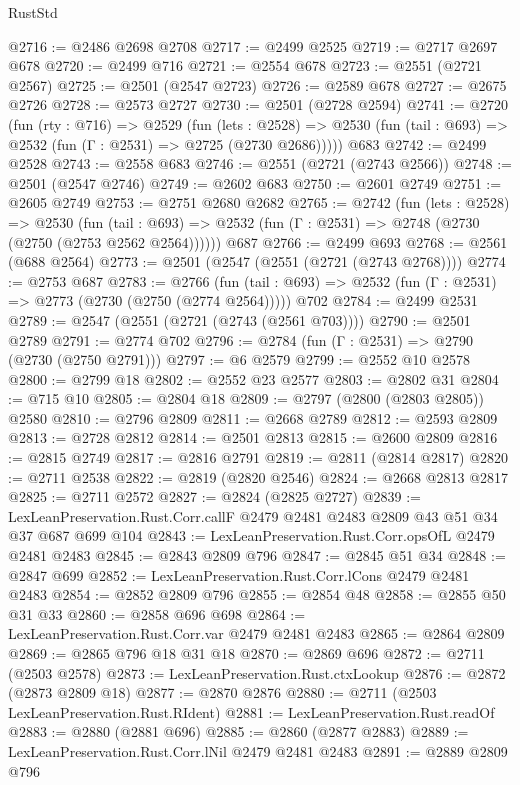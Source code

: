 \begin{lexlean}{RustStd}
\begin{coremodule}
{\begin{coremodule}
{{{{{{{{{{{{{{{{{{{{@2716 := @2486 @2698 @2708
@2717 := @2499 @2525
@2719 := @2717 @2697 @678
@2720 := @2499 @716
@2721 := @2554 @678
@2723 := @2551 (@2721 @2567)
@2725 := @2501 (@2547 @2723)
@2726 := @2589 @678
@2727 := @2675 @2726
@2728 := @2573 @2727
@2730 := @2501 (@2728 @2594)
@2741 := @2720
    (fun (rty : @716) =>
    @2529
      (fun (lets : @2528) =>
      @2530 (fun (tail : @693) => @2532 (fun (Γ : @2531) => @2725 (@2730 @2686)))))
    @683
@2742 := @2499 @2528
@2743 := @2558 @683
@2746 := @2551 (@2721 (@2743 @2566))
@2748 := @2501 (@2547 @2746)
@2749 := @2602 @683
@2750 := @2601 @2749
@2751 := @2605 @2749
@2753 := @2751 @2680 @2682
@2765 := @2742
    (fun (lets : @2528) =>
    @2530
      (fun (tail : @693) => @2532 (fun (Γ : @2531) => @2748 (@2730 (@2750 (@2753 @2562 @2564))))))
    @687
@2766 := @2499 @693
@2768 := @2561 (@688 @2564)
@2773 := @2501 (@2547 (@2551 (@2721 (@2743 @2768))))
@2774 := @2753 @687
@2783 := @2766
    (fun (tail : @693) => @2532 (fun (Γ : @2531) => @2773 (@2730 (@2750 (@2774 @2564)))))
    @702
@2784 := @2499 @2531
@2789 := @2547 (@2551 (@2721 (@2743 (@2561 @703))))
@2790 := @2501 @2789
@2791 := @2774 @702
@2796 := @2784 (fun (Γ : @2531) => @2790 (@2730 (@2750 @2791)))
@2797 := @6 @2579
@2799 := @2552 @10 @2578
@2800 := @2799 @18
@2802 := @2552 @23 @2577
@2803 := @2802 @31
@2804 := @715 @10
@2805 := @2804 @18
@2809 := @2797 (@2800 (@2803 @2805)) @2580
@2810 := @2796 @2809
@2811 := @2668 @2789
@2812 := @2593 @2809
@2813 := @2728 @2812
@2814 := @2501 @2813
@2815 := @2600 @2809
@2816 := @2815 @2749
@2817 := @2816 @2791
@2819 := @2811 (@2814 @2817)
@2820 := @2711 @2538
@2822 := @2819 (@2820 @2546)
@2824 := @2668 @2813 @2817
@2825 := @2711 @2572
@2827 := @2824 (@2825 @2727)
@2839 := LexLeanPreservation.Rust.Corr.callF @2479 @2481 @2483 @2809 @43 @51 @34 @37 @687 @699 @104
@2843 := LexLeanPreservation.Rust.Corr.opsOfL @2479 @2481 @2483
@2845 := @2843 @2809 @796
@2847 := @2845 @51 @34
@2848 := @2847 @699
@2852 := LexLeanPreservation.Rust.Corr.lCons @2479 @2481 @2483
@2854 := @2852 @2809 @796
@2855 := @2854 @48
@2858 := @2855 @50 @31 @33
@2860 := @2858 @696 @698
@2864 := LexLeanPreservation.Rust.Corr.var @2479 @2481 @2483
@2865 := @2864 @2809
@2869 := @2865 @796 @18 @31 @18
@2870 := @2869 @696
@2872 := @2711 (@2503 @2578)
@2873 := LexLeanPreservation.Rust.ctxLookup
@2876 := @2872 (@2873 @2809 @18)
@2877 := @2870 @2876
@2880 := @2711 (@2503 LexLeanPreservation.Rust.RIdent)
@2881 := LexLeanPreservation.Rust.readOf
@2883 := @2880 (@2881 @696)
@2885 := @2860 (@2877 @2883)
@2889 := LexLeanPreservation.Rust.Corr.lNil @2479 @2481 @2483
@2891 := @2889 @2809 @796
}}}}}}}}}}}}}}}}}}}}
\end{coremodule}}
\end{coremodule}
\end{lexlean}
